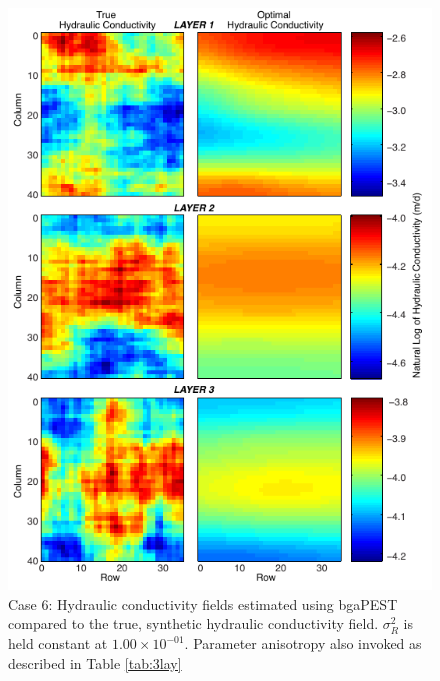 \documentclass[11pt,oneside,onecolumn]{usgsreport}
\begin{document}
\begin{appendix}
\begin{figure}[!t]
\begin{center}\includegraphics{figures/3KL_case6}\end{center}

\caption{\label{fig:3LK_case6}Case 6: Hydraulic conductivity fields estimated
using bgaPEST compared to the true, synthetic hydraulic conductivity
field. $\sigma_{R}^{2}$ is held constant at $1.00\times10^{-01}$. Parameter anisotropy also invoked as described in Table \ref{tab:3lay}}
\end{figure}



\end{appendix}
\end{document}
